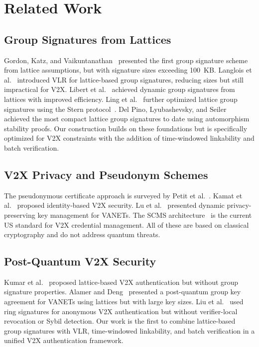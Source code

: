 \documentclass[conference,10pt]{IEEEtran}
\begin{document}
\section{Related Work}
\label{sec:related}

\subsection{Group Signatures from Lattices}

Gordon, Katz, and Vaikuntanathan~\cite{gordon2010} presented the first group signature scheme from lattice assumptions, but with signature sizes exceeding 100~KB. Langlois et al.~\cite{langlois2014} introduced VLR for lattice-based group signatures, reducing sizes but still impractical for V2X. Libert et al.~\cite{libert2016} achieved dynamic group signatures from lattices with improved efficiency. Ling et al.~\cite{ling2015} further optimized lattice group signatures using the Stern protocol~\cite{stern1996}. Del Pino, Lyubashevsky, and Seiler~\cite{del2018} achieved the most compact lattice group signatures to date using automorphism stability proofs. Our construction builds on these foundations but is specifically optimized for V2X constraints with the addition of time-windowed linkability and batch verification.

\subsection{V2X Privacy and Pseudonym Schemes}

The pseudonymous certificate approach is surveyed by Petit et al.~\cite{petit2015}. Kamat et al.~\cite{kamat2006} proposed identity-based V2X security. Lu et al.~\cite{lu2018survey} presented dynamic privacy-preserving key management for VANETs. The SCMS architecture~\cite{whyte2013, brecht2018} is the current US standard for V2X credential management. All of these are based on classical cryptography and do not address quantum threats.

\subsection{Post-Quantum V2X Security}

Kumar et al.~\cite{kumar2022pqv2x} proposed lattice-based V2X authentication but without group signature properties. Alamer and Deng~\cite{alamer2023} presented a post-quantum group key agreement for VANETs using lattices but with large key sizes. Liu et al.~\cite{liu2024pqv2x} used ring signatures for anonymous V2X authentication but without verifier-local revocation or Sybil detection. Our work is the first to combine lattice-based group signatures with VLR, time-windowed linkability, and batch verification in a unified V2X authentication framework.
\end{document}

